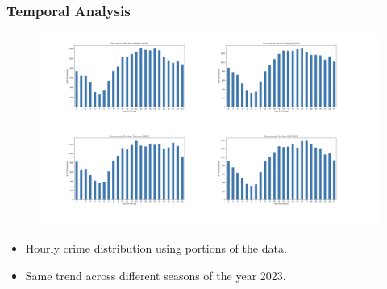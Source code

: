 \documentclass{beamer}
\begin{document}
\begin{frame}
    \frametitle{Temporal Analysis}
        \begin{figure}
            \flushleft
            \includegraphics[width=1\linewidth]{Figures/OccurencesPerSeason.001.jpeg}
        \end{figure}
        {\scriptsize %
        \begin{itemize}
            \item  Hourly crime distribution using portions of the data.
            \item  Same trend across different seasons of the year 2023.
        \end{itemize}
        }
    

\end{frame}

\end{document}
